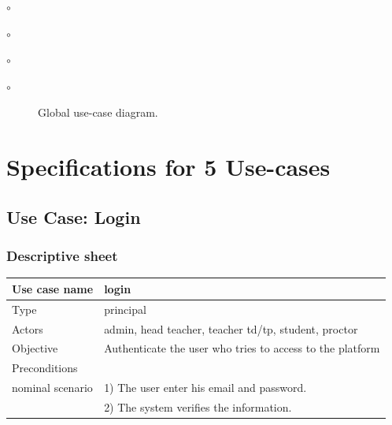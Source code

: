 \documentclass[]{uc2pfecaneva}
\begin{document}
\begin{list}{$\circ$}{}
\begin{list}{$\circ$}{}
\begin{list}{$\circ$}{}
\begin{list}{$\circ$}{}
\begin{figure}[ht]
        \caption{Global use-case diagram.}
    \end{figure}
    \clearpage


    \thispagestyle{empty}
    \begin{table}[h]
        \raggedright\section{Specifications for 5 Use-cases}

        \raggedright\subsection{Use Case: Login}
        \subsubsection{Descriptive sheet}
        \centering
        \begin{tabularx}{\textwidth}{|l|X|}
            \hline
            Use case name         & login                                                                                                                                                                \\ \hline
            Type                  & principal                                                                                                                                                            \\ \hline
            Actors                & admin, head teacher, teacher td/tp, student, proctor                                                                                                                 \\ \hline
            Objective             & Authenticate the user who tries to access to the platform                                                                                                            \\ \hline
            Preconditions         &                                                                                                                                                                      \\ \hline
            nominal scenario
            & 1) The user enter his email and password.                                                                                                                            \\
            & 2) The system verifies the information.                                                                                                                              \\

\end{tabularx}
\end{table}
\end{list}
\end{list}
\end{list}
\end{list}
\end{document}
